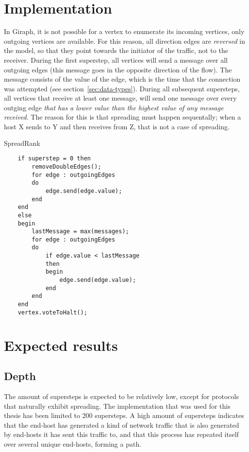 \section{Implementation}
\label{sec:implementation}
In Giraph, it is not possible for a vertex to enumerate its incoming vertices, only outgoing vertices are available.
For this reason, all direction edges are \emph{reversed} in the model, so that they point towards the initiator of the traffic, not to the receiver.
During the first superstep, all vertices will send a message over all outgoing edges (this message goes in the opposite direction of the flow).
The message consists of the value of the edge, which is the time that the connection was attempted (see section~\ref{sec:data-types}).
During all subsequent supersteps, all vertices that receive at least one message, will send one message over every outging edge \emph{that has a lower value than the highest value of any message received}.
The reason for this is that spreading must happen sequentally;
 when a host X sends to Y and then receives from Z, that is not a case of spreading.

\begin{algorithm}[H]
	\caption{SpreadRank}
	\begin{verbatim}
	if superstep = 0 then
	    removeDoubleEdges();
	    for edge : outgoingEdges
	    do
	        edge.send(edge.value);
	    end
	end
	else
	begin
	    lastMessage = max(messages);
	    for edge : outgoingEdges
	    do
	        if edge.value < lastMessage
	        then
	        begin
	            edge.send(edge.value);
	        end
	    end
	end
	vertex.voteToHalt();
	\end{verbatim}
\end{algorithm}


\section{Expected results}

\subsection{Depth}
\label{sec:depth}
The amount of supersteps is expected to be relatively low, except for protocols that naturally exhibit spreading.
The implementation that was used for this thesis has been limited to 200 supersteps.
A high amount of supersteps indicates that the end-host has generated a kind of network traffic that is also generated by end-hosts it has sent this traffic to, and that this process has repeated itself over several unique end-hosts, forming a path.


